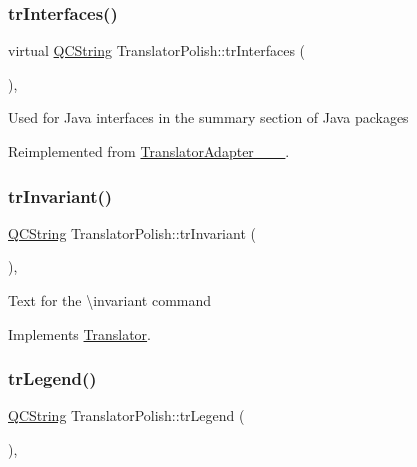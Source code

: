 \subsubsection{\texorpdfstring{trInterfaces()}{trInterfaces()}}
{\footnotesize\ttfamily virtual \mbox{\hyperlink{class_q_c_string}{Q\+C\+String}} Translator\+Polish\+::tr\+Interfaces (\begin{DoxyParamCaption}{ }\end{DoxyParamCaption})\hspace{0.3cm}{\ttfamily [inline]}, {\ttfamily [virtual]}}

Used for Java interfaces in the summary section of Java packages 

Reimplemented from \mbox{\hyperlink{class_translator_adapter__1__8__4}{Translator\+Adapter\+\_\+\_\+\_}}.

\mbox{\label{class_translator_polish_a0f58719f4f4754556253f2be4048e146}} 
\subsubsection{\texorpdfstring{trInvariant()}{trInvariant()}}
{\footnotesize\ttfamily \mbox{\hyperlink{class_q_c_string}{Q\+C\+String}} Translator\+Polish\+::tr\+Invariant (\begin{DoxyParamCaption}{ }\end{DoxyParamCaption})\hspace{0.3cm}{\ttfamily [inline]}, {\ttfamily [virtual]}}

Text for the \textbackslash{}invariant command 

Implements \mbox{\hyperlink{class_translator}{Translator}}.

\mbox{\label{class_translator_polish_aab45a1ee516e7e1bccfc3d583bfb4ab1}} 
\subsubsection{\texorpdfstring{trLegend()}{trLegend()}}
{\footnotesize\ttfamily \mbox{\hyperlink{class_q_c_string}{Q\+C\+String}} Translator\+Polish\+::tr\+Legend (\begin{DoxyParamCaption}{ }\end{DoxyParamCaption})\hspace{0.3cm}{\ttfamily [inline]}, {\ttfamily [virtual]}}

